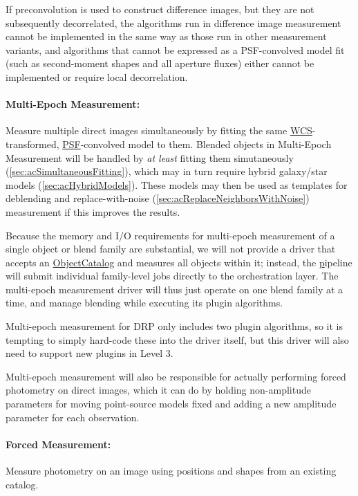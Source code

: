 If preconvolution is used to construct difference images, but they are not subsequently decorrelated, the algorithms run in difference image measurement cannot be implemented in the same way as those run in other measurement variants, and algorithms that cannot be expressed as a PSF-convolved model fit (such as second-moment shapes and all aperture fluxes) either cannot be implemented or require local decorrelation.

\paragraph{Multi-Epoch Measurement:} Measure multiple direct images simultaneously by fitting the same \hyperref[sec:spWCS]{WCS}-transformed, \hyperref[sec:spPSF]{PSF}-convolved model to them.  Blended objects in Multi-Epoch Measurement will be handled by \emph{at least} fitting them simutaneously (\ref{sec:acSimultaneousFitting}), which may in turn require hybrid galaxy/star models (\ref{sec:acHybridModels}).  These models may then be used as templates for deblending and replace-with-noise (\ref{sec:acReplaceNeighborsWithNoise}) measurement if this improves the results.
\label{sec:acMultiEpochMeasurement}

Because the memory and I/O requirements for multi-epoch measurement of a single object or blend family are substantial, we will not provide a driver that accepts an \hyperref[sec:spTablesObject]{ObjectCatalog} and measures all objects within it; instead, the \hyperref[sec:drpMultiFit] pipeline will submit individual family-level jobs directly to the orchestration layer.  The multi-epoch measurement driver will thus just operate on one blend family at a time, and manage blending while executing its plugin algorithms.

Multi-epoch measurement for DRP only includes two plugin algorithms, so it is tempting to simply hard-code these into the driver itself, but this driver will also need to support new plugins in Level 3.

Multi-epoch measurement will also be responsible for actually performing forced photometry on direct images, which it can do by holding non-amplitude parameters for moving point-source models fixed and adding a new amplitude parameter for each observation.

\paragraph{Forced Measurement:} Measure photometry on an image using positions and shapes from an existing catalog.
\label{sec:acForcedMeasurement}

